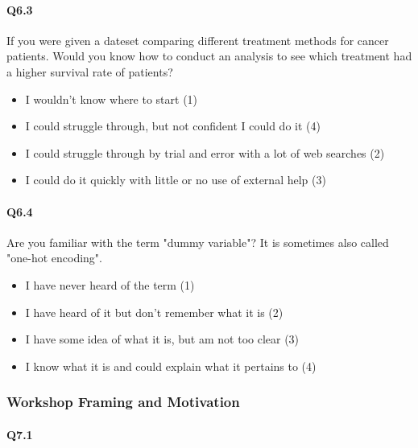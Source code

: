 \documentclass[020-persona\_validation.tex]{subfiles}
\begin{document}
        \paragraph{Q6.3}

            If you were given a dateset comparing different treatment methods for
            cancer patients. Would you know how to conduct an analysis to see which
            treatment had a higher survival rate of patients?

                \begin{itemize}
                    \item I wouldn't know where to start  (1)
                    \item I could struggle through, but not confident I could do it  (4)
                    \item I could struggle through by trial and error with a lot of web searches  (2)
                    \item I could do it quickly with little or no use of external help  (3)
                \end{itemize}

        \paragraph{Q6.4}

            Are you familiar with the term "dummy variable"? It is sometimes also
            called "one-hot encoding".

            \begin{itemize}
                \item I have never heard of the term  (1)
                \item I have heard of it but don’t remember what it is  (2)
                \item I have some idea of what it is, but am not too clear  (3)
                \item I know what it is and could explain what it pertains to  (4)
            \end{itemize}

    \subsubsection{Workshop Framing and Motivation}

        \paragraph{Q7.1}
\end{document}
